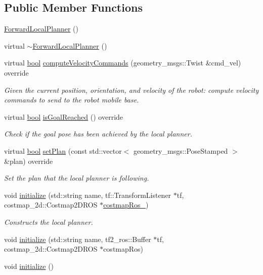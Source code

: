\subsection*{Public Member Functions}
\begin{DoxyCompactItemize}
\item 
\hyperlink{classcl__move__base__z_1_1__local__planner_1_1ForwardLocalPlanner_a9a63b7f31439c71be4b85d84af57f80e}{Forward\+Local\+Planner} ()
\item 
virtual \hyperlink{classcl__move__base__z_1_1__local__planner_1_1ForwardLocalPlanner_ad6d3e823b11a8e61c08cd8664580437b}{$\sim$\+Forward\+Local\+Planner} ()
\item 
virtual \hyperlink{classbool}{bool} \hyperlink{classcl__move__base__z_1_1__local__planner_1_1ForwardLocalPlanner_af112f9b35e8d6809398989deb0382db3}{compute\+Velocity\+Commands} (geometry\+\_\+msgs\+::\+Twist \&cmd\+\_\+vel) override
\begin{DoxyCompactList}\small\item\em Given the current position, orientation, and velocity of the robot\+: compute velocity commands to send to the robot mobile base. \end{DoxyCompactList}\item 
virtual \hyperlink{classbool}{bool} \hyperlink{classcl__move__base__z_1_1__local__planner_1_1ForwardLocalPlanner_aec6cdcaac91a0035afe8901932ffab4c}{is\+Goal\+Reached} () override
\begin{DoxyCompactList}\small\item\em Check if the goal pose has been achieved by the local planner. \end{DoxyCompactList}\item 
virtual \hyperlink{classbool}{bool} \hyperlink{classcl__move__base__z_1_1__local__planner_1_1ForwardLocalPlanner_aaf7030a16ebaed84e7e0c1a2fcc86d3c}{set\+Plan} (const std\+::vector$<$ geometry\+\_\+msgs\+::\+Pose\+Stamped $>$ \&plan) override
\begin{DoxyCompactList}\small\item\em Set the plan that the local planner is following. \end{DoxyCompactList}\item 
void \hyperlink{classcl__move__base__z_1_1__local__planner_1_1ForwardLocalPlanner_a8f02fd2b962a8b7bd0c15181d7075a89}{initialize} (std\+::string name, tf\+::\+Transform\+Listener $\ast$tf, costmap\+\_\+2d\+::\+Costmap2\+D\+R\+OS $\ast$\hyperlink{classcl__move__base__z_1_1__local__planner_1_1ForwardLocalPlanner_af52da48dab4289092464db87b92c3d8f}{costmap\+Ros\+\_\+})
\begin{DoxyCompactList}\small\item\em Constructs the local planner. \end{DoxyCompactList}\item 
void \hyperlink{classcl__move__base__z_1_1__local__planner_1_1ForwardLocalPlanner_acef12dacf37191e8615e1141a75ba803}{initialize} (std\+::string name, tf2\+\_\+ros\+::\+Buffer $\ast$tf, costmap\+\_\+2d\+::\+Costmap2\+D\+R\+OS $\ast$costmap\+Ros)
\item 
void \hyperlink{classcl__move__base__z_1_1__local__planner_1_1ForwardLocalPlanner_af8ba3dac1d8a3c27f320d486a6c462ad}{initialize} ()
\end{DoxyCompactItemize}
